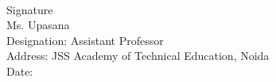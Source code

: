 \vspace{15 mm}
\\
\begin{flushleft}

Signature\\
\vspace{10 mm}
Ms. Upasana\\
Designation: Assistant Professor\\
Address: JSS Academy of Technical Education, Noida\\
\vspace{10mm}
Date:
\end{flushleft}
\restoregeometry
\newpage


\newpage
\begin{abstractpage}

\end{abstractpage}
\restoregeometry
\\

